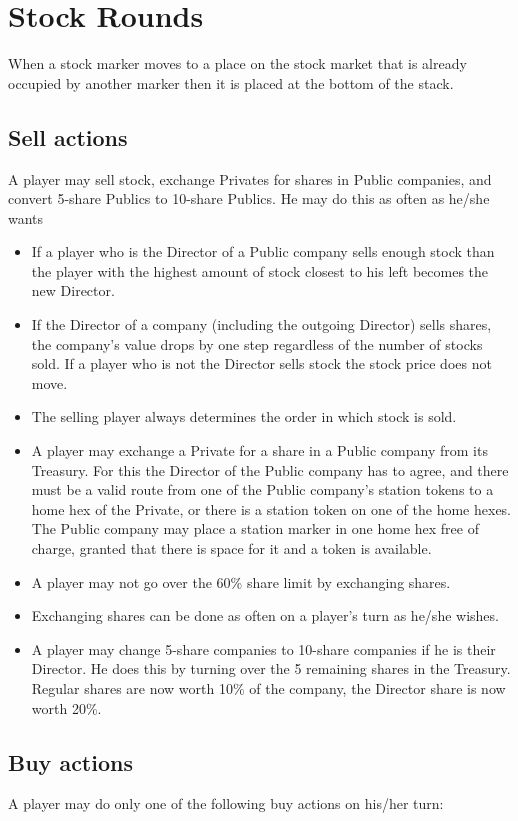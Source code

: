 \documentclass[a4paper,twocolumn]{article}
\begin{document}
\section{Stock Rounds}
When a stock marker moves to a place on the stock market that is already
occupied by another marker then it is placed at the bottom of the stack.
\subsection{Sell actions}
A player may sell stock, exchange Privates for shares in Public companies, and
convert 5-share Publics to 10-share Publics. He may do this as often as he/she
wants
\begin{itemize}
	\item If a player who is the Director of a Public company sells enough stock
	than the player with the highest amount of stock closest to his left becomes
	the new Director.
	\item If the Director of a company (including the outgoing Director) sells
	shares, the company's value drops by one step regardless of the number of
	stocks sold. If a player who is not the Director sells stock the stock price
	does not move.
	\item The selling player always determines the order in which stock is sold.
	\item A player may exchange a Private for a share in a Public company from
	its Treasury. For this the Director of the Public company has to agree, and
	there must be a valid route from one of the Public company's station tokens
	to a home hex of the Private, or there is a station token on one of the home
	hexes. The Public company may place a station marker in one home hex free of
	charge, granted that there is space for it and a token is available.
	\item A player may not go over the 60\% share limit by exchanging shares.
	\item Exchanging shares can be done as often on a player's turn as he/she
	wishes.
	\item A player may change 5-share companies to 10-share companies if he is
	their Director. He does this by turning over the 5 remaining shares in the
	Treasury. Regular shares are now worth 10\% of the company, the Director
	share is now worth 20\%.
\end{itemize}

\subsection{Buy actions}
A player may do only one of the following buy actions on his/her turn:
\end{document}
